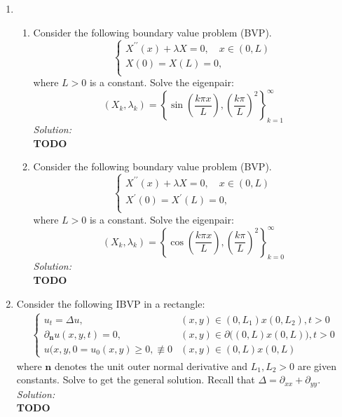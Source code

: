 \documentclass[10pt]{amsart}
\theoremstyle{nonumberplain}
\begin{document}
\begin{enumerate}[label={\bf {\arabic*}:}]
\newpage

\item 
\begin{enumerate}
\item Consider the following boundary value problem (BVP). \\
$$
\begin{cases}
X^{\prime\prime}(x) + \lambda X = 0, \quad x \in (0, L) \\
X(0)  = X(L) = 0, \\
\end{cases}
$$
where $L > 0$ is a constant.
Solve the eigenpair:
$$
(X_k, \lambda_k) = \left\{ \sin \left( \frac {k \pi x}{L} \right), \left(\frac {k \pi}{L} \right)^2 \right\}_{k=1}^\infty
$$
\textit{Solution:} \\
\textbf{TODO} \\

\item Consider the following boundary value problem (BVP). \\
$$
\begin{cases}
X^{\prime\prime}(x) + \lambda X = 0, \quad x \in (0, L) \\
X^\prime(0)  = X^\prime(L) = 0, \\
\end{cases}
$$
where $L > 0$ is a constant.
Solve the eigenpair:
$$
(X_k, \lambda_k) = \left\{ \cos \left( \frac {k \pi x}{L} \right), \left(\frac {k \pi}{L} \right)^2 \right\}_{k=0}^\infty
$$
\textit{Solution:} \\
\textbf{TODO} \\

\end{enumerate}

\newpage

\item Consider the following IBVP in a rectangle: \\
\begin{align*}
\begin{cases}
u_t = \Delta u, &(x, y) \in (0, L_1)x(0, L_2), t > 0 \\
\partial_{\bm n} u(x, y, t) = 0, &(x, y) \in \partial \big( (0, L)x(0, L) \big), t > 0\\
u(x, y, 0 = u_0(x, y) \geq 0, \not \equiv 0 &(x, y) \in (0, L)x(0, L)
\end{cases}
\end{align*}
where $\bm n$ denotes the unit outer normal derivative and $L_1, L_2 > 0$ are given constants.
Solve to get the general solution.
Recall that $\Delta = \partial_{xx} + \partial_{yy}$. \\
\textit{Solution:} \\
\textbf{TODO} \\

\end{enumerate}
\end{document}
